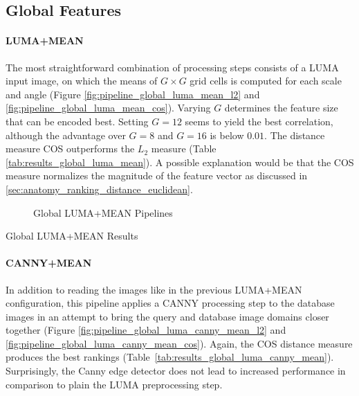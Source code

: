 \subsection{Global Features}

\paragraph{LUMA+MEAN}

The most straightforward combination of processing steps consists of a LUMA
input image, on which the means of $G \times G$ grid cells is computed for each
scale and angle (Figure \ref{fig:pipeline_global_luma_mean_l2} and
\ref{fig:pipeline_global_luma_mean_cos}). Varying $G$ determines the feature
size that can be encoded best. Setting $G=12$ seems to yield the best
correlation, although the advantage over $G=8$ and $G=16$ is below $0.01$. The
distance measure COS outperforms the $L_2$ measure (Table
\ref{tab:results_global_luma_mean}). A possible explanation would be that the
COS measure normalizes the magnitude of the feature vector as discussed in
\ref{sec:anatomy_ranking_distance_euclidean}.

\begin{figure}[h]
    \centering
    \quad
    \caption[Global LUMA+MEAN Pipelines]{
        Global LUMA+MEAN Pipelines
    }
    \label{fig:pipeline_global_luma_mean}
\end{figure}

\begin{table}[h]
    
    \caption[Global LUMA+MEAN Results]{
        Global LUMA+MEAN Results
    }
    \label{tab:results_global_luma_mean}
\end{table}

\paragraph{CANNY+MEAN}

In addition to reading the images like in the previous LUMA+MEAN configuration,
this pipeline applies a CANNY processing step to the database images in an
attempt to bring the query and database image domains closer together (Figure
\ref{fig:pipeline_global_luma_canny_mean_l2} and
\ref{fig:pipeline_global_luma_canny_mean_cos}). Again, the COS distance measure
produces the best rankings (Table~\ref{tab:results_global_luma_canny_mean}).
Surprisingly, the Canny edge detector does not lead to increased performance in
comparison to plain the LUMA preprocessing step.

